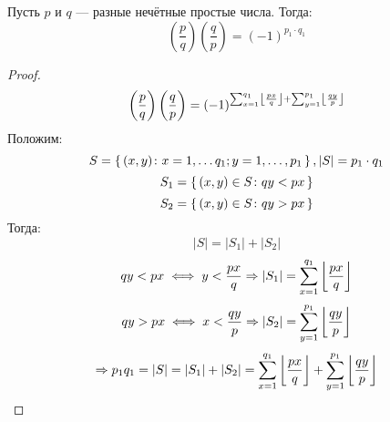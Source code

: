 Пусть $p$ и $q$ --- разные нечётные простые числа. Тогда:
\begin{equation}
  \label{eq:quadratic_law}
\left(\frac{p}{q}\right)\left(\frac{q}{p}\right) = (-1)^{p_1 \cdot q_1}
\end{equation}
\begin{proof}
\[
\left(\frac{p}{q}\right)\left(\frac{q}{p}\right) = (-1)^{\sum_{x = 1}^{q_1} \left\lfloor \frac{px}{q} \right\rfloor + \sum_{y = 1}^{p_1} \left\lfloor \frac{qy}{p} \right\rfloor}
\]
Положим:
\[
S = \set{(x, y)\colon x = 1,\ldots q_1; y = 1, \ldots, p_1}, \left|S\right| = p_1 \cdot q_1
\]
\[
S_1 = \set{(x, y) \in S \colon qy < px}
\]
\[
S_2 = \set{(x, y) \in S \colon qy > px}
\]
Тогда:
\[
\left|S\right| = \left|S_1\right| + \left|S_2\right|
\]
\[
qy < px \iff y < \frac{px}{q} \Rightarrow \left|S_1\right| = \sum_{x = 1}^{q_1} \left\lfloor \frac{px}{q} \right\rfloor
\]
\[
qy > px \iff x < \frac{qy}{p} \Rightarrow \left|S_2\right| = \sum_{y = 1}^{p_1} \left\lfloor \frac{qy}{p} \right\rfloor
\]
\[
\Rightarrow p_1q_1 = \left|S\right| = \left|S_1\right| + \left|S_2\right| = \sum_{x = 1}^{q_1} \left\lfloor \frac{px}{q} \right\rfloor + \sum_{y = 1}^{p_1} \left\lfloor \frac{qy}{p} \right\rfloor
\]
\end{proof}

